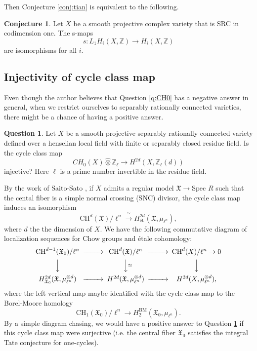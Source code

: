 \documentclass{amsart}
\theoremstyle{definition}
\newtheorem{ques}[theorem]{Question}
\newtheorem{conj}[theorem]{Conjecture}
\theoremstyle{remark}
\newcommand{\mbb}{\mathbb}
\newcommand{\ZZ}{\mbb{Z}}
\newcommand{\SP}{\text{Spec }}
\newcommand{\et}{\text{\'et}}
\begin{document}
Then Conjecture \ref{conj:tian} is equivalent to the following.
\begin{conj}\label{conj:tian_lawson}
     Let $X$ be a smooth projective complex variety that is SRC in codimension one. The s-maps $$s:L_1H_i(X, \ZZ) \to H_i(X, \ZZ)$$ are isomorphisms for all $i$.
\end{conj}

\subsection{Injectivity of cycle class map}
Even though the author believes that Question \ref{q:CH0} has a negative answer in general, when we restrict ourselves to separably rationally connected varieties, there might be a chance of having a positive answer.
\begin{ques}\label{ques}
Let $X$ be a smooth projective separably rationally connected variety defined over a henselian local field with finite or separably closed residue field. Is the cycle class map
\[
CH_0(X)\hat{\otimes} \ZZ_\ell \to H^{2d}(X, \ZZ_\ell(d))
\]
injective? Here $\ell$ is a prime number invertible in the residue field.
\end{ques}

By the work of Saito-Sato \cite[Theorem 1.16]{SaitoSato_0_cycle}, if $X$ admits a regular model $\mathfrak{X} \to \SP R$ such that the cental fiber is a simple normal crossing (SNC) divisor, the cycle class map induces an isomorphism 
\[
\text{CH}^d(\mathfrak{X})/\ell^n \xrightarrow{\cong} H^{2d}_\et(\mathfrak{X}, \mu_{\ell^n}),
\]
where $d$ the the dimension of $X$.
We have the following commutative diagram of localization sequences for Chow groups and \'etale cohomology:
\[
\begin{CD}
    \text{CH}^{d-1}(\mathfrak{X}_0)/\ell^n @>>> \text{CH}^d(\mathfrak{X})/\ell^n @>>> \text{CH}^d(X)/\ell^n \to 0\\
    @VVV @VV\cong V @VVV\\
    H^{2d}_{\mathfrak{X}_0}(\mathfrak{X}, \mu_{\ell^n}^{\otimes d})@>>>H^{2d}(\mathfrak{X}, \mu_{\ell^n}^{\otimes d})@>>> H^{2d}(X, \mu_{\ell^n}^{\otimes d}),
\end{CD}
\]
where the left vertical map maybe identified with the cycle class map to the Borel-Moore homology
\[
\text{CH}_1(\mathfrak{X}_0)/\ell^n \to H_2^{\text{BM}}(\mathfrak{X}_0, \mu_{\ell^n}).
\]
By a simple diagram chasing, we would have a positive answer to Question \ref{ques} if this cycle class map were surjective (i.e. the central fiber $\mathfrak{X}_0$ satisfies the integral Tate conjecture for one-cycles).
\end{document}
